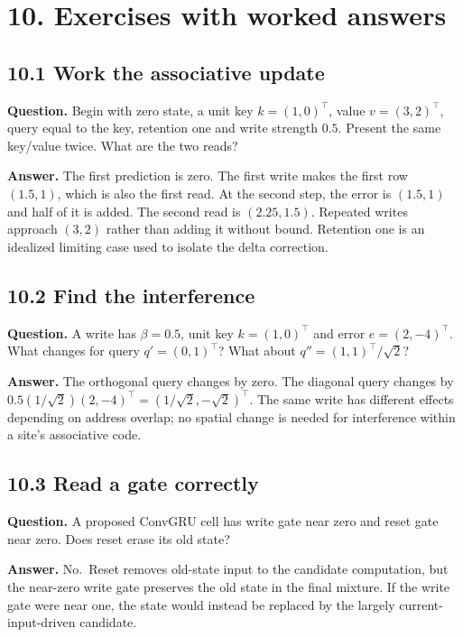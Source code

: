 \documentclass[
  11pt,
]{article}
\let\oldsubsection\subsection
\renewcommand{\subsection}{\Needspace{6\baselineskip}\oldsubsection}
\begin{document}
\newpage

\section{10. Exercises with worked
answers}\label{exercises-with-worked-answers}

\subsection{10.1 Work the associative
update}\label{work-the-associative-update}

\textbf{Question.} Begin with zero state, a unit key \(k=(1,0)^\top\),
value \(v=(3,2)^\top\), query equal to the key, retention one and write
strength \(0.5\). Present the same key/value twice. What are the two
reads?

\textbf{Answer.} The first prediction is zero. The first write makes the
first row \((1.5,1)\), which is also the first read. At the second step,
the error is \((1.5,1)\) and half of it is added. The second read is
\((2.25,1.5)\). Repeated writes approach \((3,2)\) rather than adding it
without bound. Retention one is an idealized limiting case used to
isolate the delta correction.

\subsection{10.2 Find the interference}\label{find-the-interference}

\textbf{Question.} A write has \(\beta=0.5\), unit key \(k=(1,0)^\top\)
and error \(e=(2,-4)^\top\). What changes for query \(q'=(0,1)^\top\)?
What about \(q''=(1,1)^\top/\sqrt2\)?

\textbf{Answer.} The orthogonal query changes by zero. The diagonal
query changes by \(0.5(1/\sqrt2)(2,-4)^\top=(1/\sqrt2,-\sqrt2)^\top\).
The same write has different effects depending on address overlap; no
spatial change is needed for interference within a site's associative
code.

\subsection{10.3 Read a gate correctly}\label{read-a-gate-correctly}

\textbf{Question.} A proposed ConvGRU cell has write gate near zero and
reset gate near zero. Does reset erase its old state?

\textbf{Answer.} No.~Reset removes old-state input to the candidate
computation, but the near-zero write gate preserves the old state in the
final mixture. If the write gate were near one, the state would instead
be replaced by the largely current-input-driven candidate.
\end{document}
